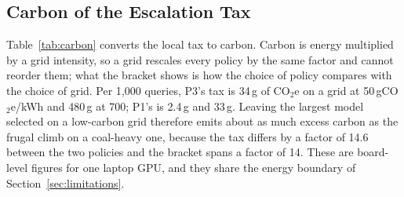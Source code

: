 \subsection{Carbon of the Escalation Tax}
\label{sec:results-carbon}

\begin{table}[!t]
\caption{Carbon of the escalation tax under oracle detection, in grams of
CO$_2$e per 1{,}000 queries. Total kWh is the policy's own energy for those
queries and Tax kWh the energy of its tax alone; each carbon figure is Tax
kWh multiplied by the grid intensity beside it. The
four intensity columns are in gCO$_2$e/kWh: 50 for a grid
carried by nuclear or hydro, 250 for a large renewable share, 475 for the
figure usually quoted as the global average, and 700 for a grid carried by
coal. They are round values spanning the range grids occupy, not
measurements of a named region.}
\label{tab:carbon}
\centering
{}
\end{table}

Table~\ref{tab:carbon} converts the local tax to carbon. Carbon is energy
multiplied by a grid intensity, so a grid rescales every policy by the same
factor and cannot reorder them; what the bracket shows is how the choice of
policy compares with the choice of grid. Per 1{,}000 queries, P3's tax is
34\,g of CO$_2$e on a grid at 50\,gCO$_2$e/kWh and 480\,g at 700; P1's is
2.4\,g and 33\,g. Leaving the largest model selected on a low-carbon grid
therefore emits about as much excess carbon as the frugal climb on a
coal-heavy one, because the tax differs by a factor of 14.6 between the two
policies and the bracket spans a factor of 14. These are board-level figures
for one laptop GPU, and they share the energy boundary of
Section~\ref{sec:limitations}.
